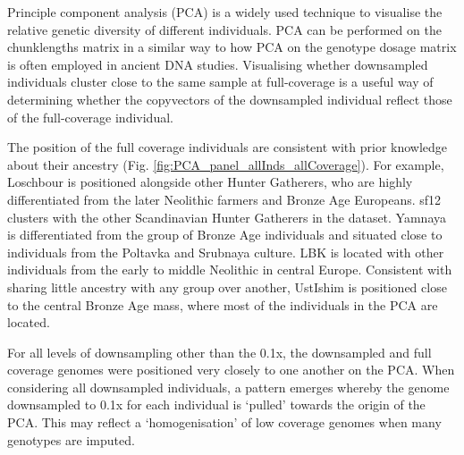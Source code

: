 Principle component analysis (PCA) is a widely used technique to visualise the relative genetic diversity of different individuals. PCA can be performed on the chunklengths matrix in a similar way to how PCA on the genotype dosage matrix is often employed in ancient DNA studies. Visualising whether downsampled individuals cluster close to the same sample at full-coverage is a useful way of determining whether the copyvectors of the downsampled individual reflect those of the full-coverage individual.

The position of the full coverage individuals are consistent with prior knowledge about their ancestry (Fig. \ref{fig:PCA_panel_allInds_allCoverage}). For example, Loschbour is positioned alongside other Hunter Gatherers, who are highly differentiated from the later Neolithic farmers and Bronze Age Europeans. sf12 clusters with the other Scandinavian Hunter Gatherers in the dataset. Yamnaya is differentiated from the group of Bronze Age individuals and situated close to individuals from the Poltavka and Srubnaya culture. LBK is located with other individuals from the early to middle Neolithic in central Europe. Consistent with sharing little ancestry with any group over another, UstIshim is positioned close to the central Bronze Age mass, where most of the individuals in the PCA are located. 

For all levels of downsampling other than the 0.1x, the downsampled and full coverage genomes were positioned very closely to one another on the PCA. When considering all downsampled individuals, a pattern emerges whereby the genome downsampled to 0.1x for each individual is `pulled' towards the origin of the PCA. This may reflect a `homogenisation' of low coverage genomes when many genotypes are imputed.


